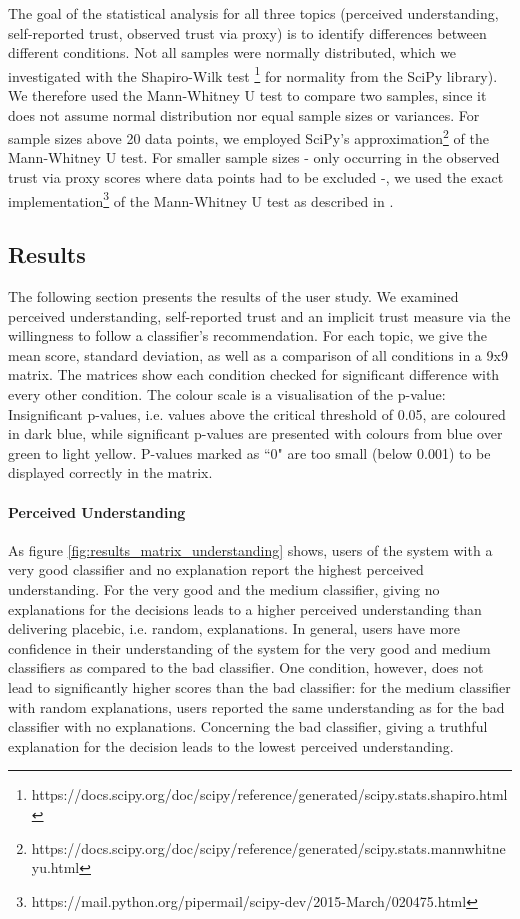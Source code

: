 The goal of the statistical analysis for all three topics (perceived understanding, self-reported trust, observed trust via proxy) is to identify differences between different conditions. Not all samples were normally distributed, which we investigated with the Shapiro-Wilk test \footnote{https://docs.scipy.org/doc/scipy/reference/generated/scipy.stats.shapiro.html} for normality from the SciPy library). We therefore used the Mann-Whitney U test to compare two samples, since it does not assume normal distribution nor equal sample sizes or variances. For sample sizes above 20 data points, we employed SciPy's approximation\footnote{https://docs.scipy.org/doc/scipy/reference/generated/scipy.stats.mannwhitneyu.html} of the Mann-Whitney U test. For smaller sample sizes - only occurring in the observed trust via proxy scores where data points had to be excluded -, we used the exact implementation\footnote{https://mail.python.org/pipermail/scipy-dev/2015-March/020475.html} of the Mann-Whitney U test as described in \cite{cheung1997mann}.


\subsection{Results}
The following section presents the results of the user study. We examined perceived understanding, self-reported trust and an implicit trust measure via the willingness to follow a classifier's recommendation. For each topic, we give the mean score, standard deviation, as well as a comparison of all conditions in a 9x9 matrix.\newline
The matrices show each condition checked for significant difference with every other condition. The colour scale is a visualisation of the p-value: Insignificant p-values, i.e. values above the critical threshold of 0.05, are coloured in dark blue, while significant p-values are presented with colours from blue over green to light yellow. P-values marked as ``0" are too small (below 0.001) to be displayed correctly in the matrix.\newline 

\paragraph{Perceived Understanding}
As figure \ref{fig:results_matrix_understanding} shows, users of the system with a very good classifier and no explanation report the highest perceived understanding. For the very good and the medium classifier, giving no explanations for the decisions leads to a higher perceived understanding than delivering placebic, i.e. random, explanations. In general, users have more confidence in their understanding of the system for the very good and medium classifiers as compared to the bad classifier. One condition, however, does not lead to significantly higher scores than the bad classifier: for the medium classifier with random explanations, users reported the same understanding as for the bad classifier with no explanations. Concerning the bad classifier, giving a truthful explanation for the decision leads to the lowest perceived understanding.

